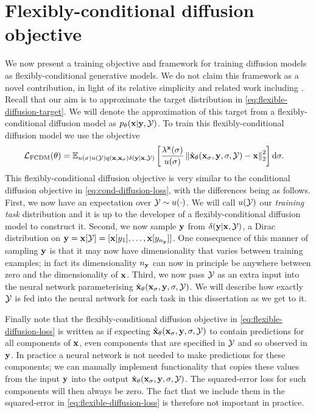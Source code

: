\section{Flexibly-conditional diffusion objective} \label{sec:flexible-diffusion-objective}
We now present a training objective and framework for training diffusion models as flexibly-conditional generative models. We do not claim this framework as a novel contribution, in light of its relative simplicity and related work including \citet{tashiro2021csdi,weilbach2023graphically}. Recall that our aim is to approximate the target distribution in \cref{eq:flexible-diffusion-target}. We will denote the approximation of this target from a flexibly-conditional diffusion model as $p_\theta({\mathbf{x}}|{\mathbf{y}},{\mathcal{Y}})$. To train this flexibly-conditional diffusion model we use the objective
\begin{align} \label{eq:flexible-diffusion-loss}
    \mathcal{L}_\text{FCDM}(\theta) &= \mathbb{E}_{u(\sigma)u({\mathcal{Y}})q({\mathbf{x}}, {\mathbf{x}}_\sigma)\delta({\mathbf{y}}|{\mathbf{x}},{\mathcal{Y}})} \left[ 
    \frac{\lambda^{\mathbf{x}}(\sigma)}{u(\sigma)} \left\| \hat{{\mathbf{x}}}_\theta({\mathbf{x}}_\sigma, {\mathbf{y}}, \sigma, {\mathcal{Y}}) - {\mathbf{x}} \right\|_2^2 \right] \mathrm{d}\sigma.
\end{align}
This flexibly-conditional diffusion objective is very similar to the conditional diffusion objective in \cref{eq:cond-diffusion-loss}, with the differences being as follows. First, we now have an expectation over ${\mathcal{Y}} \sim u(\cdot)$. We will call $u({\mathcal{Y}})$ our \textit{training task} distribution and it is up to the developer of a flexibly-conditional diffusion model to construct it. Second, we now sample ${\mathbf{y}}$ from $\delta({\mathbf{y}}|{\mathbf{x}},{\mathcal{Y}})$, a Dirac distribution on ${\mathbf{y}} = {\mathbf{x}}[{\mathcal{Y}}] = [ {\mathbf{x}}[y_1], \ldots, {\mathbf{x}}[y_{n_{\mathbf{y}}}] ]$. One consequence of this manner of sampling ${\mathbf{y}}$ is that it may now have dimensionality that varies between training examples; in fact its dimensionality $n_{\mathbf{y}}$ can now in principle be anywhere between zero and the dimensionality of ${\mathbf{x}}$. Third, we now pass ${\mathcal{Y}}$ as an extra input into the neural network parameterising $\hat{{\mathbf{x}}}_\theta({\mathbf{x}}_\sigma, {\mathbf{y}}, \sigma, {\mathcal{Y}})$. We will describe how exactly ${\mathcal{Y}}$ is fed into the neural network for each task in this dissertation as we get to it.

Finally note that the flexibly-conditional diffusion objective in \cref{eq:flexible-diffusion-loss} is written as if expecting $\hat{{\mathbf{x}}}_\theta({\mathbf{x}}_\sigma, {\mathbf{y}}, \sigma, {\mathcal{Y}})$ to contain predictions for all components of ${\mathbf{x}}$, even components that are specified in ${\mathcal{Y}}$ and so observed in ${\mathbf{y}}$. In practice a neural network is not needed to make predictions for these components; we can manually implement functionality that copies these values from the input ${\mathbf{y}}$ into the output $\hat{{\mathbf{x}}}_\theta({\mathbf{x}}_\sigma, {\mathbf{y}}, \sigma, {\mathcal{Y}})$. The squared-error loss for such components will then always be zero. The fact that we include them in the squared-error in \cref{eq:flexible-diffusion-loss} is therefore not important in practice.

